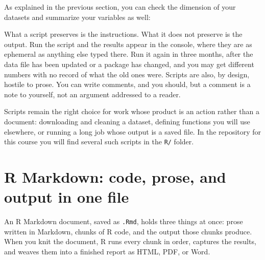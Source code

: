 \documentclass[
  a4paper,
]{scrbook}
\newenvironment{Shaded}{\begin{snugshade}}{\end{snugshade}}
\newcommand{\FunctionTok}[1]{\textcolor[rgb]{0.28,0.35,0.67}{#1}}
\newcommand{\NormalTok}[1]{\textcolor[rgb]{0.00,0.23,0.31}{#1}}
\newcommand{\SpecialCharTok}[1]{\textcolor[rgb]{0.37,0.37,0.37}{#1}}
\begin{document}
As explained in the previous section, you can check the dimension of
your datasets and summarize your variables as well:

\begin{Shaded}
\end{Shaded}

What a script preserves is the instructions. What it does not preserve
is the output. Run the script and the results appear in the console,
where they are as ephemeral as anything else typed there. Run it again
in three months, after the data file has been updated or a package has
changed, and you may get different numbers with no record of what the
old ones were. Scripts are also, by design, hostile to prose. You can
write comments, and you should, but a comment is a note to yourself, not
an argument addressed to a reader.

Scripts remain the right choice for work whose product is an action
rather than a document: downloading and cleaning a dataset, defining
functions you will use elsewhere, or running a long job whose output is
a saved file. In the repository for this course you will find several
such scripts in the \texttt{R/} folder.

\section*{R Markdown: code, prose, and output in one
file}\label{r-markdown-code-prose-and-output-in-one-file}


An R Markdown document, saved as \texttt{.Rmd}, holds three things at
once: prose written in Markdown, chunks of R code, and the output those
chunks produce. When you knit the document, R runs every chunk in order,
captures the results, and weaves them into a finished report as HTML,
PDF, or Word.
\end{document}
